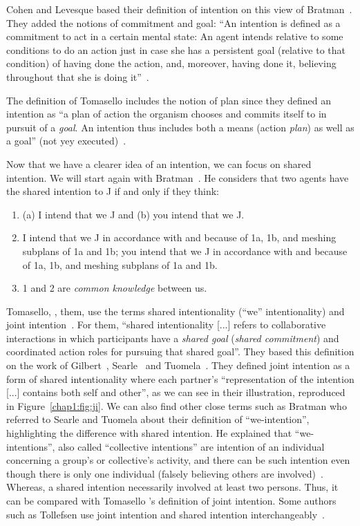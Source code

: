 \documentclass[a4paper,11pt,twoside]{StyleThese}
\begin{document}
Cohen and Levesque based their definition of intention on this view of Bratman~\cite{cohen_1990_intention}. They added the notions of commitment and goal: ``An intention is defined as a commitment to act in a certain mental state: An agent intends relative to some conditions to do an action just in case she has a persistent goal (relative to that condition) of having done the action, and, moreover, having done it, believing throughout that she is doing it''~\cite[p.~496]{cohen_1991_teamwork}. 

The definition of Tomasello \etal{} includes the notion of plan since they defined an intention as ``a plan of action the organism chooses and commits itself to in pursuit of a \emph{goal}. An intention thus includes both a means (action \emph{plan}) as well as a goal'' (not yey executed)~\cite[p.~676]{tomasello_2005_understanding}. 

Now that we have a clearer idea of an intention, we can focus on shared intention. We will start again with Bratman~\cite{bratman_1993_shared}. He considers that two agents have the shared intention to J if and only if they think: 
\begin{enumerate}
	\item (a) I intend that we J and (b) you intend that we J.
	\item\relax I intend that we J in accordance with and because of 1a, 1b, and meshing subplans of 1a and 1b; you intend that we J in accordance with and because of 1a, 1b, and meshing subplans of 1a and 1b.
	\item 1 and 2 are \emph{common knowledge} between us.
\end{enumerate}

Tomasello, \etal{}, them, use the terms shared intentionality (``we'' intentionality) and joint intention~\cite{tomasello_2005_understanding}. For them, ``shared intentionality [...] refers to collaborative interactions in which participants have a \emph{shared goal} (\emph{shared commitment}) and coordinated action roles for pursuing that shared goal''. They based this definition on the work of Gilbert~\cite{gilbert_1989_social}, Searle~\cite{searle_1983_intentionality} and Tuomela~\cite{tuomela_1995_importance}. They defined joint intention as a form of shared intentionality where each partner's ``representation of the intention [...] contains both self and other'', as we can see in their illustration, reproduced in Figure~\ref{chap1:fig:ji}. We can also find other close terms such as Bratman who referred to Searle and Tuomela about their definition of ``we-intention'', highlighting the difference with shared intention. He explained that ``we-intentions'', also called ``collective intentions'' are intention of an individual concerning a group's or collective's activity, and there can be such intention even though there is only one individual (falsely believing others are involved)~\cite{bratman_1993_shared}. Whereas, a shared intention necessarily involved at least two persons. Thus, it can be compared with Tomasello \etal{}'s definition of joint intention. Some authors such as Tollefsen use joint intention and shared intention interchangeably~\cite{tollefsen_2005_let}.
\end{document}
